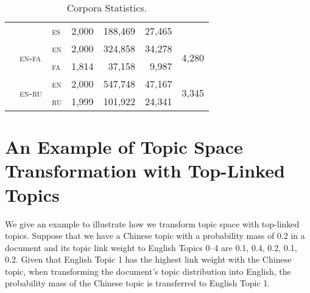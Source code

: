 \documentclass[paper=a4, fontsize=11pt]{article}
\newcommand{\en}{\textsc{en}\xspace}
\newcommand{\es}{\textsc{es}\xspace}
\newcommand{\fa}{\textsc{fa}\xspace}
\newcommand{\ru}{\textsc{ru}\xspace}
\begin{document}
\begin{table}[h]
\begin{tabular}{lllrrrr}
     & & \es & 2,000 & 188,469 & 27,465 & \\ \cline{2-7}
     & \multirow{2}{*}{\en-\fa} & \en & 2,000 & 324,858 & 34,278 & \multirow{2}{*}{4,280} \\
     & & \fa & 1,814 & 37,158 & 9,987 & \\ \cline{2-7}
     & \multirow{2}{*}{\en-\ru} & \en & 2,000 & 547,748 & 47,167 & \multirow{2}{*}{3,345} \\
     & & \ru & 1,999 & 101,922 & 24,341 & \\ \hline
  \end{tabular}
  \caption{Corpora Statistics.}\label{tab:stats}
\end{table}

\section{An Example of Topic Space Transformation with Top-Linked Topics}

We give an example to illustrate how we transform topic space with top-linked topics. Suppose that we have a Chinese topic with a probability mass of 0.2 in a document and its topic link weight to English Topics 0--4 are 0.1, 0.4, 0.2, 0.1, 0.2. Given that English Topic 1 has the highest link weight with the Chinese topic, when transforming the document's topic distribution into English, the probability mass of the Chinese topic is transferred to English Topic 1.

%


\end{document}
